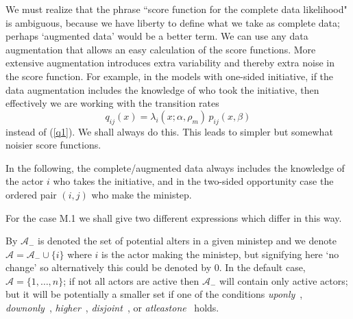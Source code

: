\documentclass[a4paper,12pt,fleqn]{article}
\newcommand{\nnm}[1]{\textsf{\small\textit{#1}\ }}
\begin{document}
We must realize that the phrase ``score function for the complete data likelihood"
is ambiguous, because we have liberty to define what we take as complete data;
perhaps `augmented data' would be a better term.
We can use any data augmentation that allows an easy calculation
of the score functions.
More extensive augmentation introduces extra variability and thereby
extra noise in the score function.
For example, in the models with one-sided initiative, if the data augmentation
includes the knowledge of who took the initiative, then effectively we are working
with the transition rates
\begin{equation}
  q_{ij}(x) = \lambda_i(x; \alpha, \rho_m)\,p_{ij}(x, \beta)
\end{equation}
instead of (\ref{q1}). We shall always do this.
This leads to simpler but somewhat noisier score functions.

In the following, the complete/augmented data always includes the knowledge
of the actor $i$ who takes the initiative,
and in the two-sided opportunity case the ordered pair $(i,j)$ who make the ministep.

For the case M.1 we shall give two different expressions
which differ in this way.

By $\mathcal A_-$ is denoted the set of potential alters in a given ministep
and we denote $\mathcal A = \mathcal A_- \cup \{i\}$ where $i$ is the actor making
the ministep, but signifying here `no change' so
alternatively this could be denoted by 0. In the default case, $\mathcal A = \{1, \ldots, n\}$;
if not all actors are active then $\mathcal A_-$ will contain only active actors;
but it will be potentially a smaller set if one of the conditions \nnm{uponly},
\nnm{downonly}, \nnm{higher}, \nnm{disjoint}, or \nnm{atleastone} holds.
\end{document}

